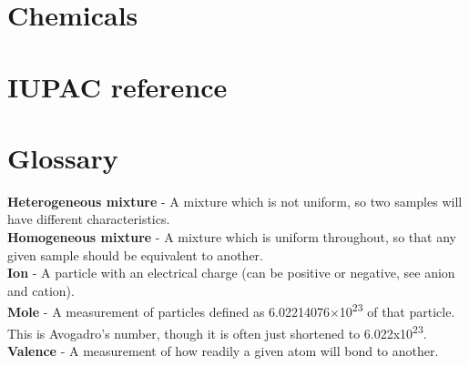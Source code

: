 \documentclass{book}
\begin{document}
\chapter{Chemicals}






\chapter{IUPAC reference}

\chapter{Glossary}
\textbf{Heterogeneous mixture} - A mixture which is not uniform, so two samples will have different characteristics.\\
\textbf{Homogeneous mixture} - A mixture which is uniform throughout, so that any given sample should be equivalent to another.\\
\textbf{Ion} - A particle with an electrical charge (can be positive or negative, see anion and cation).\\
\textbf{Mole} - A measurement of particles defined as 6.02214076×10\textsuperscript{23} of that particle.  This is Avogadro's number, though it is often just shortened to 6.022x10\textsuperscript{23}.\\
\textbf{Valence} - A measurement of how readily a given atom will bond to another.\\
\end{document}
